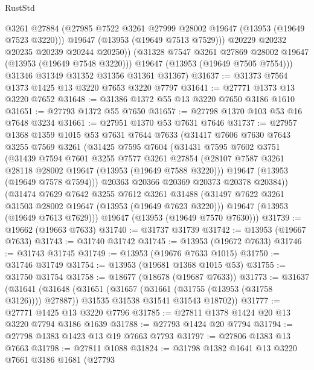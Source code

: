 \begin{lexlean}{RustStd}
\begin{coremodule}
              @3261
              @27884
              (@27985 @7522 @3261 @27999 @28002 @19647 (@13953 (@19649 @7523 @3220)))
              @19647
              (@13953 (@19649 @7513 @7529)))
            @20229
            @20232
            @20235
            @20239
            @20244
            @20250))
        (@31328 @7547 @3261 @27869 @28002 @19647 (@13953 (@19649 @7548 @3220)))
        @19647
        (@13953 (@19649 @7505 @7554)))
      @31346
      @31349
      @31352
      @31356
      @31361
      @31367)
@31637 := @31373 @7564 @1373 @1425 @13 @3220 @7653 @3220 @7797
@31641 := @27771 @1373 @13 @3220 @7652
@31648 := @31386 @1372 @55 @13 @3220 @7650 @3186 @1610
@31651 := @27793 @1372 @55 @7650
@31657 := @27798 @1370 @103 @53 @16 @7648 @3234
@31661 := @27951 @1370 @53 @7631 @7646
@31737 := @27957
    @1368
    @1359
    @1015
    @53
    @7631
    @7644
    @7633
    (@31417
      @7606
      @7630
      @7643
      @3255
      @7569
      @3261
      (@31425
        @7595
        @7604
        (@31431
          @7595
          @7602
          @3751
          (@31439
            @7594
            @7601
            @3255
            @7577
            @3261
            @27854
            (@28107 @7587 @3261 @28118 @28002 @19647 (@13953 (@19649 @7588 @3220)))
            @19647
            (@13953 (@19649 @7578 @7594)))
          @20363
          @20366
          @20369
          @20373
          @20378
          @20384))
      (@31474
        @7629
        @7642
        @3255
        @7612
        @3261
        @31488
        (@31497 @7622 @3261 @31503 @28002 @19647 (@13953 (@19649 @7623 @3220)))
        @19647
        (@13953 (@19649 @7613 @7629)))
      @19647
      (@13953 (@19649 @7570 @7630)))
@31739 := @19662 (@19663 @7633)
@31740 := @31737 @31739
@31742 := @13953 (@19667 @7633)
@31743 := @31740 @31742
@31745 := @13953 (@19672 @7633)
@31746 := @31743 @31745
@31749 := @13953 (@19676 @7633 @1015)
@31750 := @31746 @31749
@31754 := @13953 (@19681 @1368 @1015 @53)
@31755 := @31750 @31754
@31758 := @18677 (@18678 (@19687 @7633))
@31773 := @31637
    (@31641
      (@31648
        (@31651 (@31657 (@31661 (@31755 (@13953 (@31758 @3126)))) @27887))
        @31535
        @31538
        @31541
        @31543
        @18702))
@31777 := @27771 @1425 @13 @3220 @7796
@31785 := @27811 @1378 @1424 @20 @13 @3220 @7794 @3186 @1639
@31788 := @27793 @1424 @20 @7794
@31794 := @27798 @1383 @1423 @13 @19 @7663 @7793
@31797 := @27806 @1383 @13 @7663
@31798 := @27811 @1088
@31824 := @31798
    @1382
    @1641
    @13
    @3220
    @7661
    @3186
    @1681
    (@27793

\end{coremodule}
\end{lexlean}
